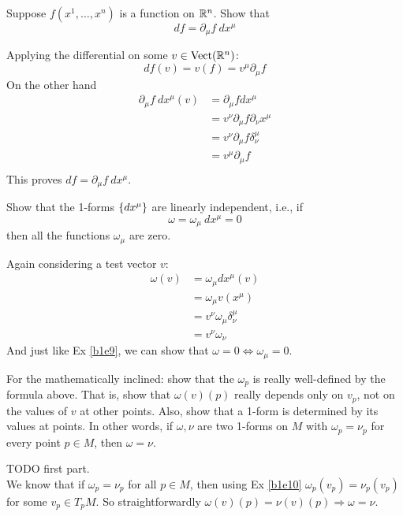 \documentclass[10pt]{article}
\begin{document}
\begin{example}\label{b1e28}
	Suppose $f(x^1,\dots,x^n)$ is a function on $\mathbb{R}^n$. Show that
	$$
		df=\partial_\mu f\: dx^\mu
	$$
\end{example}
\sol Applying the differential on some $v \in \text{Vect}(\mathbb{R}^n)$:
$$
	df(v) = v(f) = v^\mu\partial_\mu f
$$
On the other hand
$$
\begin{aligned}
	\partial_\mu f\: dx^\mu(v) &= \partial_\mu f dx^\mu\\
	&= v^\nu\partial_\mu f\partial_\nu x^\mu\\
	&= v^\nu\partial_\mu f\delta_\nu^\mu\\
	&= v^\mu\partial_\mu f\\
\end{aligned}
$$
This proves $df=\partial_\mu f\: dx^\mu$.


\begin{example}
	Show that the 1-forms $\lbrace dx^\mu\rbrace$ are linearly independent, i.e., if
	$$
		\omega = \omega_\mu\: dx^\mu = 0
	$$
	then all the functions $\omega_\mu$ are zero.
\end{example}
\sol Again considering a test vector $v$:
$$
\begin{aligned}
	\omega(v) &= \omega_\mu dx^\mu(v)\\
	&= \omega_\mu v(x^\mu)\\
	&= v^\nu \omega_\mu \delta^\mu_\nu\\
	&= v^\nu \omega_\nu
\end{aligned}
$$
And just like Ex \ref{b1e9}, we can show that $\omega = 0 \Leftrightarrow \omega_\mu = 0$.


\begin{example}\label{b1e30}
	For the mathematically inclined: show that the $\omega_p$ is really well-defined by the formula above. That is, show that $\omega(v)(p)$ really depends only on $v_p$, not on the values of $v$ at other points. Also, show that a 1-form is determined by its values at points. In other words, if $\omega,\nu$ are two 1-forms on $M$ with $\omega_p=\nu_p$ for every point $p \in M$, then $\omega=\nu$.
\end{example}
\sol TODO first part.\\
We know that if $\omega_p=\nu_p$ for all $p \in M$, then using Ex \ref{b1e10} $\omega_p(v_p)=\nu_p(v_p)$ for some $v_p \in T_pM$. So straightforwardly $\omega(v)(p)=\nu(v)(p) \Rightarrow \omega = \nu$.
\end{document}
